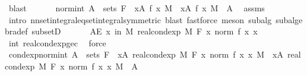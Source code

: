 \begin{isabellebody}
\ blast\isanewline
\ \ \isanewline
\ \ \isamarkupfalse%
\ norm{\isacharunderscore}{\kern0pt}int{\isacharcolon}{\kern0pt}\ {\isachardoublequoteopen}A\ {\isasymin}\ sets\ F\ {\isasymLongrightarrow}\ {\isacharparenleft}{\kern0pt}{\isasymintegral}x{\isasymin}A{\isachardot}{\kern0pt}\ {\isasymbar}f\ x{\isasymbar}\ {\isasympartial}M{\isacharparenright}{\kern0pt}\ {\isacharequal}{\kern0pt}\ {\isacharparenleft}{\kern0pt}{\isasymintegral}\isactrlsup {\isacharplus}{\kern0pt}x{\isasymin}A{\isachardot}{\kern0pt}\ {\isasymbar}f\ x{\isasymbar}\ {\isasympartial}M{\isacharparenright}{\kern0pt}{\isachardoublequoteclose}\ \ A\ \isamarkupfalse%
\ assms\ \isamarkupfalse%
\ {\isacharparenleft}{\kern0pt}intro\ nn{\isacharunderscore}{\kern0pt}set{\isacharunderscore}{\kern0pt}integral{\isacharunderscore}{\kern0pt}eq{\isacharunderscore}{\kern0pt}set{\isacharunderscore}{\kern0pt}integral{\isacharbrackleft}{\kern0pt}symmetric{\isacharbrackright}{\kern0pt}{\isacharcomma}{\kern0pt}\ blast{\isacharcomma}{\kern0pt}\ fastforce{\isacharparenright}{\kern0pt}\ {\isacharparenleft}{\kern0pt}meson\ subalg\ subalgebra{\isacharunderscore}{\kern0pt}def\ subsetD{\isacharparenright}{\kern0pt}\isanewline
\ \ \isanewline
\ \ \isamarkupfalse%
\ {\isachardoublequoteopen}AE\ x\ in\ M{\isachardot}{\kern0pt}\ real{\isacharunderscore}{\kern0pt}cond{\isacharunderscore}{\kern0pt}exp\ M\ F\ {\isacharparenleft}{\kern0pt}{\isasymlambda}x{\isachardot}{\kern0pt}\ norm\ {\isacharparenleft}{\kern0pt}f\ x{\isacharparenright}{\kern0pt}{\isacharparenright}{\kern0pt}\ x\ {\isasymge}\ {}{\isachardoublequoteclose}\ \isamarkupfalse%
\ int\ real{\isacharunderscore}{\kern0pt}cond{\isacharunderscore}{\kern0pt}exp{\isacharunderscore}{\kern0pt}ge{\isacharunderscore}{\kern0pt}c\ \isamarkupfalse%
\ force\isanewline
\ \ \isamarkupfalse%
\ cond{\isacharunderscore}{\kern0pt}exp{\isacharunderscore}{\kern0pt}norm{\isacharunderscore}{\kern0pt}int{\isacharcolon}{\kern0pt}\ {\isachardoublequoteopen}A\ {\isasymin}\ sets\ F\ {\isasymLongrightarrow}\ {\isacharparenleft}{\kern0pt}{\isasymintegral}x{\isasymin}A{\isachardot}{\kern0pt}\ real{\isacharunderscore}{\kern0pt}cond{\isacharunderscore}{\kern0pt}exp\ M\ F\ {\isacharparenleft}{\kern0pt}{\isasymlambda}x{\isachardot}{\kern0pt}\ norm\ {\isacharparenleft}{\kern0pt}f\ x{\isacharparenright}{\kern0pt}{\isacharparenright}{\kern0pt}\ x\ {\isasympartial}M{\isacharparenright}{\kern0pt}\ {\isacharequal}{\kern0pt}\ {\isacharparenleft}{\kern0pt}{\isasymintegral}\isactrlsup {\isacharplus}{\kern0pt}x{\isasymin}A{\isachardot}{\kern0pt}\ real{\isacharunderscore}{\kern0pt}cond{\isacharunderscore}{\kern0pt}exp\ M\ F\ {\isacharparenleft}{\kern0pt}{\isasymlambda}x{\isachardot}{\kern0pt}\ norm\ {\isacharparenleft}{\kern0pt}f\ x{\isacharparenright}{\kern0pt}{\isacharparenright}{\kern0pt}\ x\ {\isasympartial}M{\isacharparenright}{\kern0pt}{\isachardoublequoteclose}\ \ A\ \isamarkupfalse%

\end{isabellebody}
